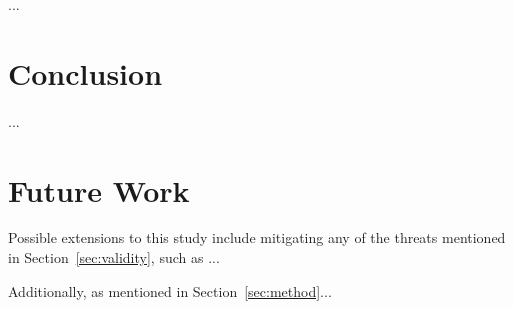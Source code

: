 \documentclass[conference]{IEEEtran}
\begin{document}
...

\section{Conclusion}\label{sec:conclusion}
...

\section{Future Work}\label{sec:future}
Possible extensions to this study include mitigating any of the threats mentioned in Section~\ref{sec:validity}, such as ...

Additionally, as mentioned in Section~\ref{sec:method}...



\end{document}
